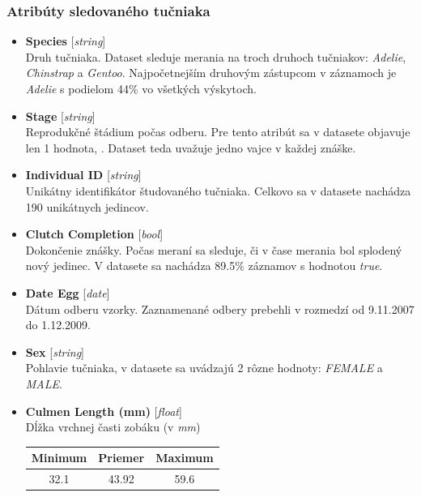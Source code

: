 \documentclass[a4paper, 16pt]{article}
\begin{document}
\subsubsection{Atribúty sledovaného tučniaka}
\begin{itemize}
     \item \textbf{Species} [\emph{string}]\\
    Druh tučniaka. Dataset sleduje merania na troch druhoch tučniakov: \emph{Adelie}, \emph{Chinstrap} a \emph{Gentoo}. Najpočetnejším druhovým zástupcom v záznamoch je \emph{Adelie} s podielom  44\% vo všetkých výskytoch.
    \item \textbf{Stage} [\emph{string}]\\
    Reprodukčné štádium počas odberu. Pre tento atribút sa v datasete objavuje len 1 hodnota, . Dataset teda uvažuje jedno vajce v každej znáške.
    
    \item \textbf{Individual ID} [\emph{string}]\\
    Unikátny identifikátor študovaného tučniaka. Celkovo sa v datasete nachádza 190 unikátnych jedincov.
    
    \item\textbf{ Clutch Completion} [\emph{bool}]\\
    Dokončenie znášky. Počas meraní sa sleduje, či v čase merania bol splodený nový jedinec. V datasete sa nachádza 89.5\% záznamov s hodnotou \emph{true}.
    
    \item \textbf{Date Egg} [\emph{date}]\\
    Dátum odberu vzorky. Zaznamenané odbery prebehli v rozmedzí od 9.11.2007 do  1.12.2009.
    
    \item \textbf{Sex} [\emph{string}]\\
    Pohlavie tučniaka, v datasete sa uvádzajú 2 rôzne hodnoty: \emph{FEMALE} a \emph{MALE}. 
    
    \item \textbf{Culmen Length (mm)} [\emph{float}]\\
    Dĺžka vrchnej časti zobáku (v \emph{mm})
    
    \begin{table}[H]
    \centering
    \begin{tabular}{|c|c|c|}
    \hline
    \textbf{Minimum} & \textbf{Priemer} & \textbf{Maximum} \\ \hline
             32.1             &     43.92             &   59.6                    \\ \hline
    \end{tabular}
    \end{table}
    

\end{itemize}
\end{document}
